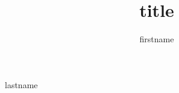 \documentclass{TUD-phdReport2021}
\begin{document}
\title[subtitle]{title}
\author{firstname}{lastname}

\frontmatter



\tableofcontents

\mainmatter

\thumbtrue




%

\thumbfalse
\printbibliography
\end{document}
